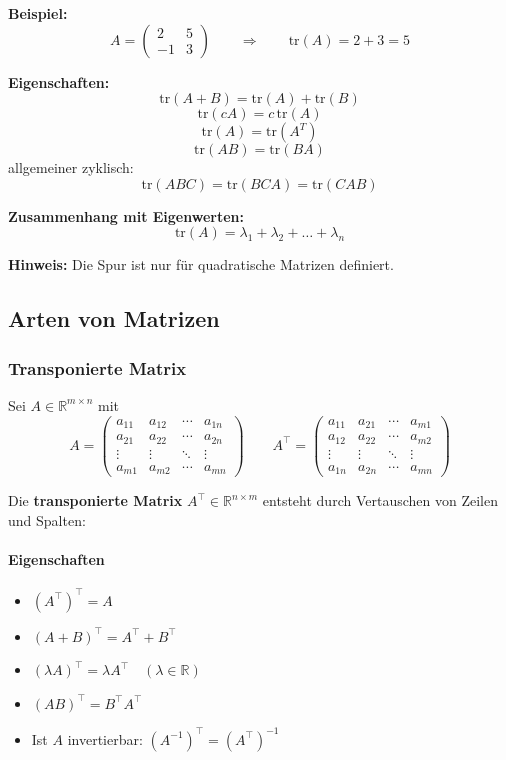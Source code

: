 \documentclass[10pt,a4paper,twocolumn]{article}
\begin{document}
	\textbf{Beispiel:}
	\[
	A=\begin{pmatrix}
		2 & 5\\
		-1 & 3
	\end{pmatrix}
	\qquad\Rightarrow\qquad
	\mathrm{tr}(A)=2+3=5
	\]
	
	\textbf{Eigenschaften:}
	\[
	\mathrm{tr}(A+B)=\mathrm{tr}(A)+\mathrm{tr}(B)
	\]
	\[
	\mathrm{tr}(cA)=c\,\mathrm{tr}(A)
	\]
	\[
	\mathrm{tr}(A)=\mathrm{tr}(A^T)
	\]
	\[
	\mathrm{tr}(AB)=\mathrm{tr}(BA)
	\]
	allgemeiner zyklisch:
	\[
	\mathrm{tr}(ABC)=\mathrm{tr}(BCA)=\mathrm{tr}(CAB)
	\]
	
	\textbf{Zusammenhang mit Eigenwerten:}
	\[
	\mathrm{tr}(A)=\lambda_1+\lambda_2+\dots+\lambda_n
	\]
	
	\textbf{Hinweis:} Die Spur ist nur für quadratische Matrizen definiert.
	
	\subsection{Arten von Matrizen}
	\subsubsection{Transponierte Matrix}
	
	Sei $A \in \mathbb{R}^{m \times n}$ mit
	\[
	A=\begin{pmatrix}
		a_{11}&a_{12}&\cdots&a_{1n}\\
		a_{21}&a_{22}&\cdots&a_{2n}\\
		\vdots&\vdots&\ddots&\vdots\\
		a_{m1}&a_{m2}&\cdots&a_{mn}
	\end{pmatrix}
	\qquad
	A^\top=\begin{pmatrix}
		a_{11}&a_{21}&\cdots&a_{m1}\\
		a_{12}&a_{22}&\cdots&a_{m2}\\
		\vdots&\vdots&\ddots&\vdots\\
		a_{1n}&a_{2n}&\cdots&a_{mn}
	\end{pmatrix}
	\]
	
	Die \textbf{transponierte Matrix} $A^\top \in \mathbb{R}^{n \times m}$ entsteht durch Vertauschen von Zeilen und Spalten:
	
	\paragraph*{Eigenschaften}
	\begin{itemize}
		\item $(A^\top)^\top = A$
		\item $(A + B)^\top = A^\top + B^\top$
		\item $(\lambda A)^\top = \lambda A^\top \quad (\lambda \in \mathbb{R})$
		\item $(AB)^\top = B^\top A^\top$
		\item Ist $A$ invertierbar: $(A^{-1})^\top = (A^\top)^{-1}$
	\end{itemize}
	
\end{document}
